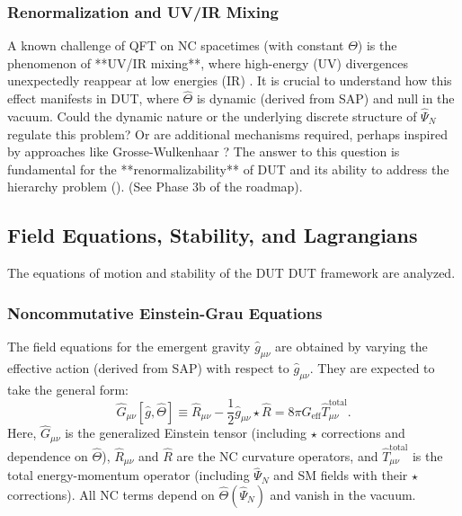 \documentclass[11pt, a4paper]{article}
\theoremstyle{remark}
\newcommand{\Op}[1]{\hat{#1}}
\newcommand{\Star}{\star}
\begin{document}
\subsubsection{Renormalization and UV/IR Mixing}
\label{ssubsec:renormalization_final}
A known challenge of QFT on NC spacetimes (with constant \( \Theta \)) is the phenomenon of **UV/IR mixing**, where high-energy (UV) divergences unexpectedly reappear at low energies (IR) \citep{Minwalla:1999px, Hayakawa:1999yt}. It is crucial to understand how this effect manifests in DUT, where \( \Op{\Theta} \) is dynamic (derived from SAP) and null in the vacuum. Could the dynamic nature or the underlying discrete structure of \( \Op{\Psi}_N \) regulate this problem? Or are additional mechanisms required, perhaps inspired by approaches like Grosse-Wulkenhaar \citep{GrosseWulkenhaar2005}? The answer to this question is fundamental for the **renormalizability** of DUT and its ability to address the hierarchy problem (). (See Phase 3b of the roadmap).

\subsection{Field Equations, Stability, and Lagrangians }
\label{subsec:field_eqs_stability_final}

The equations of motion and stability of the DUT DUT framework are analyzed.

\subsubsection{Noncommutative Einstein-Grau Equations}
\label{ssubsec:einstein_grau_nc_final}
The field equations for the emergent gravity \( \Op{g}_{\mu\nu} \) are obtained by varying the effective action (derived from SAP) with respect to \( \Op{g}_{\mu\nu} \). They are expected to take the general form:
\begin{equation}\label{eq:einstein_grau_op_final}
\Op{G}_{\mu\nu}[\Op{g}, \Op{\Theta}] \equiv \Op{R}_{\mu\nu} - \frac{1}{2} \Op{g}_{\mu\nu} \Star \Op{R} = 8\pi G_{\text{eff}} \Op{T}_{\mu\nu}^{\text{total}}.
\end{equation}
Here, \( \Op{G}_{\mu\nu} \) is the generalized Einstein tensor (including \( \star \) corrections and dependence on \( \Op{\Theta} \)), \( \Op{R}_{\mu\nu} \) and \( \Op{R} \) are the NC curvature operators, and \( \Op{T}_{\mu\nu}^{\text{total}} \) is the total energy-momentum operator (including \( \Op{\Psi}_N \) and SM fields with their \( \star \) corrections). All NC terms depend on \( \Op{\Theta}(\Op{\Psi}_N) \) and vanish in the vacuum.
\end{document}
